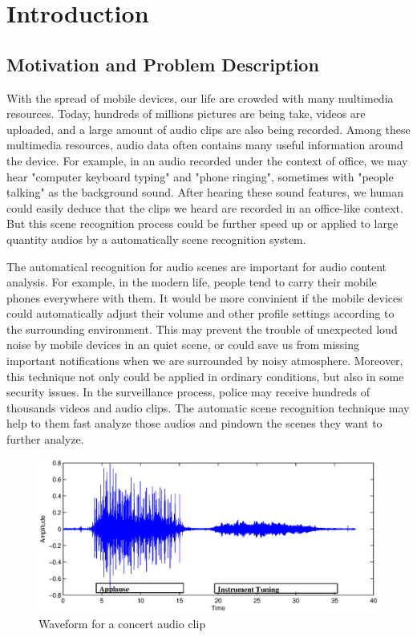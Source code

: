 
\chapter{Introduction}

\section{Motivation and Problem Description}
With the spread of mobile devices, our life are crowded with many multimedia resources. 
Today, hundreds of millions pictures are being take, videos are uploaded, and a large amount of audio clips are also being recorded. 
Among these multimedia resources, audio data often contains many useful information around the device. 
For example, in an audio recorded under the context of office, we may hear "computer keyboard typing" and "phone ringing", sometimes with "people talking" as the background sound. 
After hearing these sound features, we human could easily deduce that the clips we heard are recorded in an office-like context. 
But this scene recognition process could be further speed up or applied to large quantity audios by a automatically scene recognition system.  

The automatical recognition for audio scenes are important for audio content analysis. 
For example, in the modern life, people tend to carry their mobile phones everywhere with them. 
It would be more convinient if the mobile devices could automatically adjust their volume and other profile settings according to the surrounding environment. 
This may prevent the trouble of unexpected loud noise by mobile devices in an quiet scene, or could save us from missing important notifications when we are surrounded by noisy atmosphere.  
Moreover, this technique not only could be applied in ordinary conditions, but also in some security issues. 
In the surveillance process, police may receive hundreds of thousands videos and audio clips. 
The automatic scene recognition technique may help to them fast analyze those audios and pindown the scenes they want to further analyze. 

\begin{figure}[htb]
\centering
\includegraphics[scale=0.6]{figure/intro/waveform}
\caption{Waveform for a concert audio clip}
\label{fig:waveform}
\end{figure}

